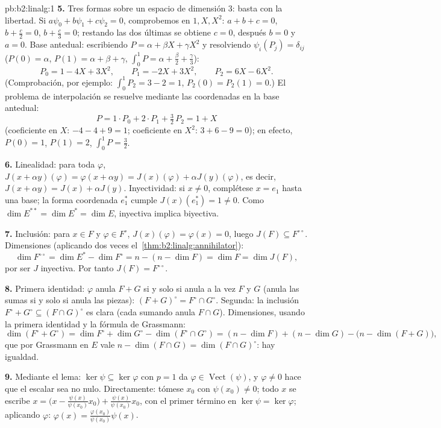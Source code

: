 \begin{solution}{pb:b2:linalg:1}
\textbf{5.} Tres formas sobre un espacio de dimensión $3$: basta
con la libertad. Si $a\psi_0 + b\psi_1 + c\psi_2 = 0$,
comprobemos en $1, X, X^2$: $a + b + c = 0$, $b + \frac c2 = 0$,
$b + \frac c3 = 0$; restando las dos últimas se obtiene $c = 0$,
después $b = 0$ y $a = 0$. Base antedual: escribiendo $P = \alpha
+ \beta X + \gamma X^2$ y resolviendo $\psi_i(P_j) = \delta_{ij}$
($P(0) = \alpha$, $P(1) = \alpha + \beta + \gamma$, $\int_0^1 P =
\alpha + \frac\beta2 + \frac\gamma3$):
\[
P_0 = 1 - 4X + 3X^2, \qquad
P_1 = -2X + 3X^2, \qquad
P_2 = 6X - 6X^2 .
\]
(Comprobación, por ejemplo: $\int_0^1 P_2 = 3 - 2 = 1$, $P_2(0) =
P_2(1) = 0$.) El problema de interpolación se resuelve mediante
las coordenadas en la base antedual:
\[
P = 1\cdot P_0 + 2\cdot P_1 + \tfrac32\, P_2 = 1 + X
\]
(coeficiente en $X$: $-4 - 4 + 9 = 1$; coeficiente en $X^2$: $3 +
6 - 9 = 0$); en efecto, $P(0) = 1$, $P(1) = 2$, $\int_0^1 P =
\frac32$.

\textbf{6.} Linealidad: para toda $\varphi$, $J(x + \alpha
y)(\varphi) = \varphi(x + \alpha y) = J(x)(\varphi) + \alpha
J(y)(\varphi)$, es decir, $J(x + \alpha y) = J(x) + \alpha J(y)$.
Inyectividad: si $x \neq 0$, complétese $x = e_1$ hasta una base;
la forma coordenada $e_1^*$ cumple $J(x)(e_1^*) = 1 \neq 0$. Como
$\dim E^{**} = \dim E^* = \dim E$, inyectiva implica biyectiva.

\textbf{7.} Inclusión: para $x \in F$ y $\varphi \in F^\circ$,
$J(x)(\varphi) = \varphi(x) = 0$, luego $J(F) \subseteq
F^{\circ\circ}$. Dimensiones (aplicando dos veces el~\cref{thm:b2:linalg:annihilator}):
\[
\dim F^{\circ\circ} = \dim E^* - \dim F^\circ
= n - (n - \dim F) = \dim F = \dim J(F),
\]
por ser $J$ inyectiva. Por tanto $J(F) = F^{\circ\circ}$.

\textbf{8.} Primera identidad: $\varphi$ anula $F + G$ si y solo
si anula a la vez $F$ y $G$ (anula las sumas si y solo si anula
las piezas): $(F+G)^\circ = F^\circ \cap G^\circ$. Segunda: la
inclusión $F^\circ + G^\circ \subseteq (F \cap G)^\circ$ es clara
(cada sumando anula $F \cap G$). Dimensiones, usando la primera
identidad y la fórmula de Grassmann:
\[
\dim(F^\circ + G^\circ) = \dim F^\circ + \dim G^\circ -
\dim(F^\circ \cap G^\circ)
= (n - \dim F) + (n - \dim G) - \bigl(n - \dim(F +
G)\bigr),
\]
que por Grassmann en $E$ vale $n - \dim(F \cap G) = \dim(F \cap
G)^\circ$: hay igualdad.

\textbf{9.} Mediante el lema: $\ker\psi \subseteq \ker\varphi$ con
$p = 1$ da $\varphi \in \operatorname{Vect}(\psi)$, y $\varphi
\neq 0$ hace que el escalar sea no nulo. Directamente: tómese
$x_0$ con $\psi(x_0) \neq 0$; todo $x$ se escribe $x = \bigl(x -
\frac{\psi(x)}{\psi(x_0)}x_0\bigr) + \frac{\psi(x)}{\psi(x_0)}
x_0$, con el primer término en $\ker\psi = \ker\varphi$;
aplicando $\varphi$: $\varphi(x) =
\frac{\varphi(x_0)}{\psi(x_0)}\psi(x)$.


\end{solution}
